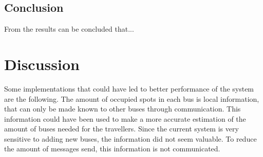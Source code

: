 \documentclass{article}
\begin{document}
\subsection{Conclusion}
From the results can be concluded that...

\section{Discussion}
Some implementations that could have led to better performance of the system are the following.
\newline
The amount of occupied spots in each bus is local information, that can only be made known to other buses through communication. This information could have been used to make a more accurate estimation of the amount of buses needed for the travellers. Since the current system is very sensitive to adding new buses, the information did not seem valuable. To reduce the amount of messages send, this information is not communicated.

\newpage
\onecolumn


\end{document}
